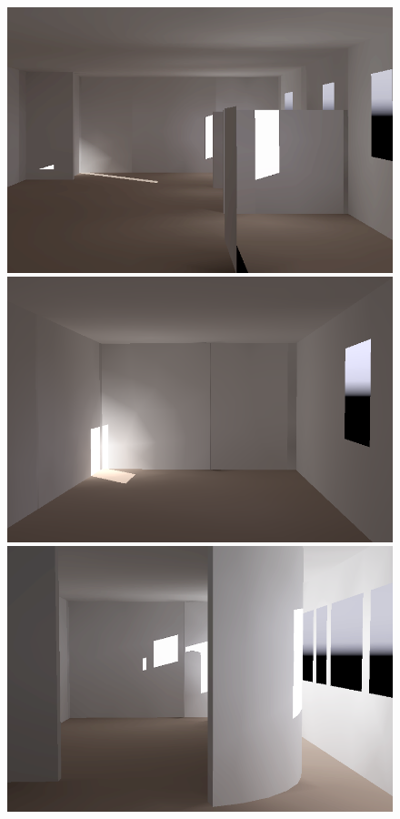 \begin{figure}[t]
\includegraphics[width=\figwidth]{p3r_N6_dec_dark.png} \hfill
\includegraphics[width=\figwidth]{p3r_042_camera_dark_december_crop.png} %
\includegraphics[width=\figwidth]{p3r_A3_dec_dark.png}


\end{figure}
